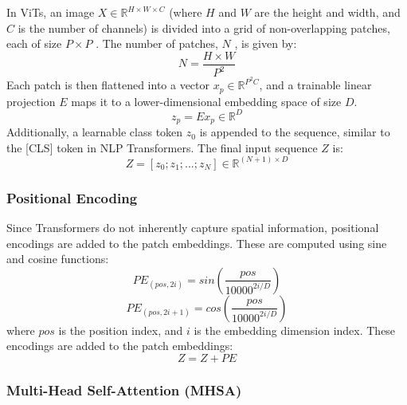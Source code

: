 In ViTs, an image $ X \in  \mathbb{R}^{H \times W \times C}$ (where $H$ and $W$ are the height and width, and $C$ is the number of channels) is divided into a grid of non-overlapping patches, each of size $ P \times P$ . The number of patches, $N$ , is given by:
\begin{equation}
    N = \frac{H \times W}{P^2}
\end{equation}
Each patch is then flattened into a vector $ x_p \in \mathbb{R}^{P^2 C}$, and a trainable linear projection $E$ maps it to a lower-dimensional embedding space of size $D$. 
\begin{equation}
    z_p = Ex_p \in \mathbb{R}^D
\end{equation}
Additionally, a learnable class token $z_0$ is appended to the sequence, similar to the [CLS] token in NLP Transformers. The final input sequence $Z$ is:
\begin{equation}
    Z = [z_0 ; z_1 ; ... ; z_N] \in \mathbb{R}^{(N+1)\times D}
\end{equation}

\subsubsection*{Positional Encoding}

Since Transformers do not inherently capture spatial information, positional encodings are added to the patch embeddings. These are computed using sine and cosine functions:
\begin{equation}
    PE_{(pos,2i)} = sin \left( \frac{pos}{10000^{2i/D}} \right)
\end{equation}
\begin{equation}
    PE_{(pos,2i+1)} = cos \left( \frac{pos}{10000^{2i/D}} \right)
\end{equation}
where $pos$ is the position index, and $i$ is the embedding dimension index. These encodings are added to the patch embeddings:
\begin{equation}
    Z = Z + PE
\end{equation}

\subsubsection*{Multi-Head Self-Attention (MHSA)}

